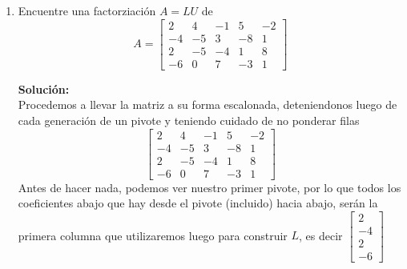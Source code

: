 \documentclass[12pt]{article}
\newenvironment{solucion}
{\begin{mdframed}[backgroundcolor=black!10]
		{\bf Solución:}\\
	}
	{
	\end{mdframed}
}
\newenvironment{preguntas}
{\begin{enumerate}\itemsep12pt
	}
	{
	\end{enumerate}
}
\begin{document}
\begin{preguntas}
\item Encuentre una factorziación $A = LU$ de
	$$A = \begin{bmatrix}
	2 & 4 & -1 & 5 & -2 \\
	-4 & -5 & 3 & -8 & 1 \\
	2 & -5 & -4 & 1 & 8 \\
	-6 & 0 & 7 & -3 & 1
	\end{bmatrix}$$
\begin{solucion}
Procedemos a llevar la matriz a su forma escalonada, deteniendonos luego de cada generación de un pivote y teniendo cuidado de no ponderar filas
		$$\begin{bmatrix}
		2 & 4 & -1 & 5 & -2 \\
		-4 & -5 & 3 & -8 & 1 \\
		2 & -5 & -4 & 1 & 8 \\
		-6 & 0 & 7 & -3 & 1
		\end{bmatrix}$$
		Antes de hacer nada, podemos ver nuestro primer pivote, por lo que todos los coeficientes abajo que hay desde el pivote (incluido) hacia abajo, serán la primera columna que utilizaremos luego para construir $L$, es decir $\begin{bmatrix} 2\\-4\\2\\-6\end{bmatrix}$
		

\end{solucion}
\end{preguntas}
\end{document}
